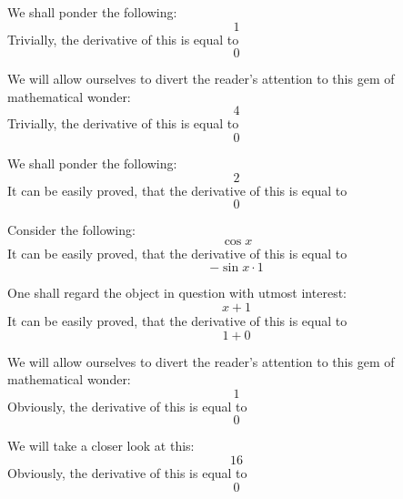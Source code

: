 \documentclass{article}
\begin{document}
We shall ponder the following:
\begin{equation}
1 
\end{equation}
Trivially, the derivative of this is equal to
\begin{equation}
0 
\end{equation}

We will allow ourselves to divert the reader's attention to this gem of mathematical wonder:
\begin{equation}
4 
\end{equation}
Trivially, the derivative of this is equal to
\begin{equation}
0 
\end{equation}

We shall ponder the following:
\begin{equation}
2 
\end{equation}
It can be easily proved, that the derivative of this is equal to
\begin{equation}
0 
\end{equation}

Consider the following:
\begin{equation}
\cos x 
\end{equation}
It can be easily proved, that the derivative of this is equal to
\begin{equation}
-\sin x \cdot 1 
\end{equation}

One shall regard the object in question with utmost interest:
\begin{equation}
x + 1 
\end{equation}
It can be easily proved, that the derivative of this is equal to
\begin{equation}
1 + 0 
\end{equation}

We will allow ourselves to divert the reader's attention to this gem of mathematical wonder:
\begin{equation}
1 
\end{equation}
Obviously, the derivative of this is equal to
\begin{equation}
0 
\end{equation}

We will take a closer look at this:
\begin{equation}
16 
\end{equation}
Obviously, the derivative of this is equal to
\begin{equation}
0 
\end{equation}
\end{document}
